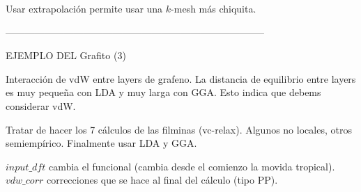   Usar extrapolación permite usar una $k$-mesh más chiquita.

  --------------------------------------------------------------------------------

  EJEMPLO DEL Grafito (3)

  Interacción de vdW entre layers de grafeno. La distancia de equilibrio entre layers es muy pequeña con LDA y muy larga con GGA. Esto indica que debems considerar vdW.

  Tratar de hacer los 7 cálculos de las filminas (vc-relax). Algunos no locales, otros semiempírico. Finalmente usar LDA y GGA.

  $input\_dft$ cambia el funcional (cambia desde el comienzo la movida tropical).
  $vdw\_corr$ correcciones que se hace al final del cálculo (tipo PP).
